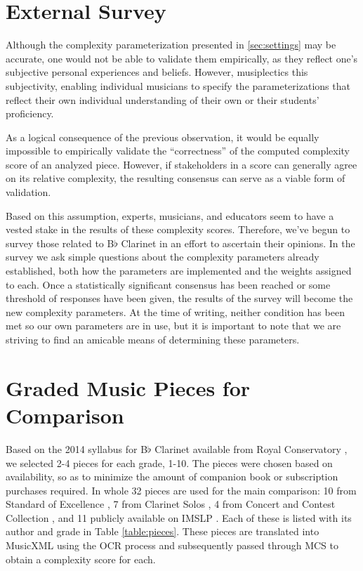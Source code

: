 \documentclass[12pt]{report}
\begin{document}
\section{External Survey} 
\label{sec:survey}

Although the complexity parameterization presented in \ref{sec:settings} may be accurate, one would not be able to validate them empirically, as they reflect one's subjective personal experiences and beliefs. However, musiplectics this subjectivity, enabling individual musicians to specify the parameterizations that reflect their own individual understanding of their own or their students' proficiency.

As a logical consequence of the previous observation, it would be equally impossible to empirically validate the ``correctness'' of the computed complexity score of an analyzed piece. However, if stakeholders in a score can generally agree on its relative complexity, the resulting consensus can serve as a viable form of validation.

Based on this assumption, experts, musicians, and educators seem to have a vested stake in the results of these complexity scores. Therefore, we've begun to survey those related to B$\flat$ Clarinet in an effort to ascertain their opinions. In the survey we ask simple questions about the complexity parameters already established, both how the parameters are implemented and the weights assigned to each. Once a statistically significant consensus has been reached or some threshold of responses have been given, the results of the survey will become the new complexity parameters. At the time of writing, neither condition has been met so our own parameters are in use, but it is important to note that we are striving to find an amicable means of determining these parameters.

\section{Graded Music Pieces for Comparison}
\label{sec:pieces}

Based on the 2014 syllabus for B$\flat$ Clarinet available from Royal Conservatory \cite{RoyalSyllabus}, we selected 2-4 pieces for each grade, 1-10. The pieces were chosen based on availability, so as to minimize the amount of companion book or subscription purchases required. In whole 32 pieces are used for the main comparison: 10 from Standard of Excellence \cite{Standard}, 7 from Clarinet Solos \cite{Solos}, 4 from Concert and Contest Collection \cite{Concert}, and 11 publicly available on IMSLP \cite{IMSLP}. Each of these is listed with its author and grade in Table \ref{table:pieces}. These pieces are translated into MusicXML using the OCR process and subsequently passed through MCS to obtain a complexity score for each.
\end{document}
